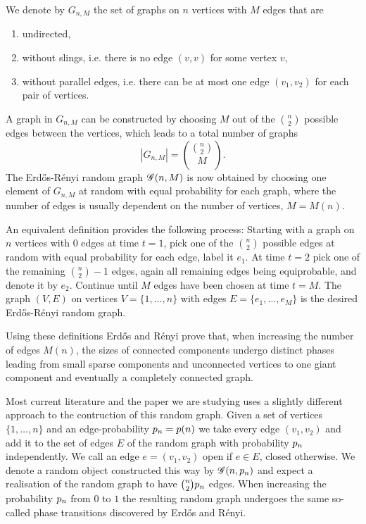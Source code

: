 We denote by $G_{n,M}$ the set of graphs on $n$ vertices with $M$ edges that are
\begin{enumerate}
	\item undirected,
	\item without slings, i.e. there is no edge $(v,v)$ for some vertex $v$,
	\item without parallel edges, i.e. there can be at most one edge $(v_1, v_2)$ for each pair of vertices.
\end{enumerate}
A graph in $G_{n,M}$ can be constructed by choosing $M$ out of the $\binom{n}{2}$ possible edges between the vertices,
which leads to a total number of graphs
\begin{equation}
	|G_{n,M}| = \binom{\binom{n}{2}}{M}.
\end{equation}
The Erd\H{o}s-Rényi random graph $\mathscr{G}(n, M)$ is now obtained by choosing one element of $G_{n,M}$ at random
with equal probability for each graph, where the number of edges is usually dependent on the number of vertices, $M = M(n)$.

An equivalent definition provides the following process:
Starting with a graph on $n$ vertices with $0$ edges at time $t=1$, 
pick one of the $\binom{n}{2}$ possible edges at random with equal probability for each edge,
label it $e_1$.
At time $t=2$ pick one of the remaining $\binom{n}{2}-1$ edges, again all remaining edges being equiprobable,
and denote it by $e_2$.
Continue until $M$ edges have been chosen at time $t=M$.
The graph $(V,E)$ on vertices $V = \{1, \dots, n\}$ with edges $E = \{e_1, \dots, e_M\}$ is the desired Erd\H{o}s-Rényi random graph.

Using these definitions Erd\H{o}s and Rényi prove that,
when increasing the number of edges $M(n)$,
the sizes of connected components undergo distinct phases leading from small sparse components and unconnected vertices
to one giant component and eventually a completely connected graph.

Most current literature and the paper we are studying uses a slightly different approach to the contruction of this random graph.
Given a set of vertices $\{1, \dots, n\}$ and an edge-probability $p_n = p(n)$
we take every edge $(v_1, v_2)$ and add it to the set of edges $E$ of the random graph with probability $p_n$ independently.
We call an edge $e = (v_1, v_2)$ open if $e \in E$, closed otherwise.
We denote a random object constructed this way by $\mathscr{G}(n, p_n)$ and expect a realisation of the random graph to have $\binom{n}{2}p_n$ edges.
When increasing the probability $p_n$ from $0$ to $1$ the resulting random graph undergoes the same so-called phase transitions
discovered by Erd\H{o}s and Rényi.

